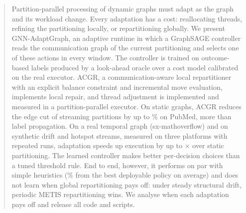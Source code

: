 \begin{abstract}
Partition-parallel processing of dynamic graphs must adapt as the graph and its workload
change. Every adaptation has a cost: reallocating threads, refining the partitioning locally,
or repartitioning globally. We present GNN-AdaptGraph, an adaptive runtime in which a
GraphSAGE controller reads the communication graph of the current partitioning and selects
one of these actions in every window. The controller is trained on outcome-based labels
produced by a look-ahead oracle over a cost model calibrated on the real executor.
\mbox{ACGR}, a communication-aware local repartitioner with an explicit balance constraint and
incremental move evaluation, implements local repair, and thread adjustment is implemented
and measured in a partition-parallel executor. On static graphs, ACGR reduces the edge cut of
streaming partitions by up to \EOnePubHashCutRed\% on PubMed, more than label propagation. On
a real temporal graph (sx-mathoverflow) and on synthetic drift and hotspot streams, measured
on three platforms with repeated runs, adaptation speeds up execution by up to
\SpPubEightSmAlwaysTA$\times$ over static partitioning. The learned controller makes better
per-decision choices than a tuned threshold rule. End to end, however, it performs on par with
simple heuristics (\RobGSAGEMean\% from the best deployable policy on average) and does not learn
when global repartitioning pays off: under steady structural drift, periodic METIS
repartitioning wins. We analyse when each adaptation pays off and release all code and scripts.
\end{abstract}
